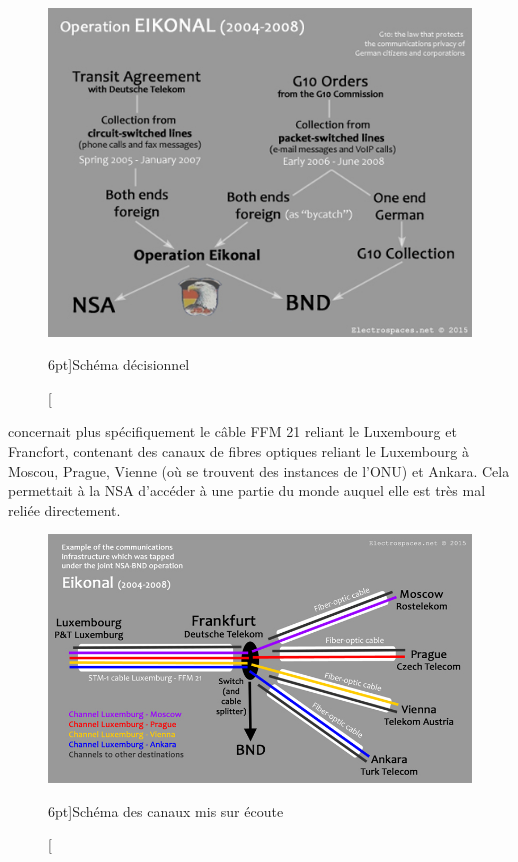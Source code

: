 \begin{figure}
\includegraphics{eikonal2.jpg}
\caption[Schéma décisionnel de l'opération EIKONAL][6pt]{Schéma décisionnel}
\label{fig:eikonal2}
\end{figure}

 concernait plus spécifiquement le câble FFM 21
reliant le Luxembourg et Francfort, contenant des canaux de fibres optiques
reliant le Luxembourg à Moscou, Prague, Vienne (où se trouvent des instances de
l'ONU) et Ankara\autocite{eikonal3}. Cela permettait à la NSA d'accéder à une partie du
monde auquel elle est très mal reliée directement.

\begin{figure}[!h]
\includegraphics{eikonal3.jpg}
\caption[Schéma des canaux mis sur écoute][6pt]{Schéma des canaux mis sur
écoute}
\label{fig:eikonal3}
\end{figure}


